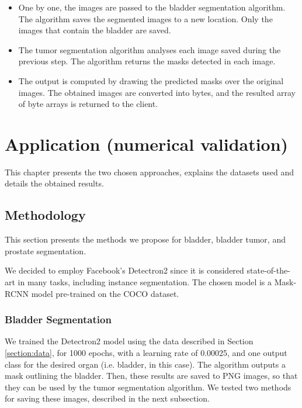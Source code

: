 \documentclass[runningheads,a4paper,11pt]{report}
\begin{document}
\begin{minipage}{0.45\textwidth}
\begin{itemize}
\item One by one, the images are passed to the bladder segmentation algorithm. The algorithm saves the segmented images to a new location. Only the images that contain the bladder are saved.
\item The tumor segmentation algorithm analyses each image saved during the previous step. The algorithm returns the masks detected in each image.
\item The output is computed by drawing the predicted masks over the original images. The obtained images are converted into bytes, and the resulted array of byte arrays is returned to the client.  
\end{itemize}
\end{minipage}


\chapter{Application (numerical validation)}
\label{chapter:application}

This chapter presents the two chosen approaches, explains the datasets used and details the obtained results.

\section{Methodology}
\label{section:methodology}

This section presents the methods we propose for bladder, bladder tumor, and prostate segmentation.

We decided to employ Facebook's Detectron2 \cite{wu2019detectron2} since it is considered state-of-the-art in many tasks, including instance segmentation. The chosen model is a Mask-RCNN model pre-trained on the COCO dataset. 

\subsection{Bladder Segmentation}

We trained the Detectron2 model using the data described in Section \ref{section:data}, for 1000 epochs, with a learning rate of 0.00025, and one output class for the desired organ (i.e. bladder, in this case). The algorithm outputs a mask outlining the bladder. Then, these results are saved to PNG images, so that they can be used by the tumor segmentation algorithm. We tested two methods for saving these images, described in the next subsection.
\end{document}
